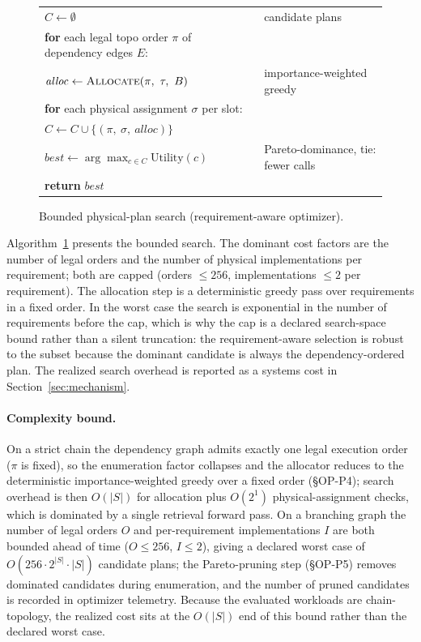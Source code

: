 \begin{figure}[t]
\centering
\caption{Bounded physical-plan search (requirement-aware optimizer).}
\label{alg:search}
\small
\begin{tabular}{@{}l@{}l}
$C \leftarrow \emptyset$ & candidate plans \\
\textbf{for} each legal topo order $\pi$ of dependency edges $E$: & \\
\quad $\mathit{alloc} \leftarrow \textsc{Allocate}(\pi,\ \tau,\ B)$ & importance-weighted greedy \\
\quad \textbf{for} each physical assignment $\sigma$ per slot: & \\
\qquad $C \leftarrow C \cup \{(\pi,\ \sigma,\ \mathit{alloc})\}$ & \\
$\mathit{best} \leftarrow \arg\max_{c\in C} \mathrm{Utility}(c)$ & Pareto-dominance, tie: fewer calls \\
\textbf{return} $\mathit{best}$ &
\end{tabular}
\end{figure}

Algorithm~\ref{alg:search} presents the bounded search. The dominant cost
factors are the number of legal orders and the number of physical
implementations per requirement; both are capped (orders $\le 256$,
implementations $\le 2$ per requirement). The allocation step is a deterministic
greedy pass over requirements in a fixed order. In the worst case the search is
exponential in the number of requirements before the cap, which is why the cap
is a declared search-space bound rather than a silent truncation: the
requirement-aware selection is robust to the subset because the dominant
candidate is always the dependency-ordered plan. The realized search overhead
is reported as a systems cost in Section~\ref{sec:mechanism}.

\paragraph{Complexity bound.}
On a strict chain the dependency graph admits exactly one legal execution order
($\pi$ is fixed), so the enumeration factor collapses and the allocator reduces
to the deterministic importance-weighted greedy over a fixed order
(\S OP-P4); search overhead is then $O(|S|)$ for allocation plus $O(2^1)$
physical-assignment checks, which is dominated by a single retrieval forward
pass. On a branching graph the number of legal orders $O$ and per-requirement
implementations $I$ are both bounded ahead of time ($O \le 256$, $I \le 2$),
giving a declared worst case of $O(256 \cdot 2^{|S|} \cdot |S|)$ candidate
plans; the Pareto-pruning step (\S OP-P5) removes dominated candidates during
enumeration, and the number of pruned candidates is recorded in optimizer
telemetry. Because the evaluated workloads are chain-topology, the realized
cost sits at the $O(|S|)$ end of this bound rather than the declared worst case.
